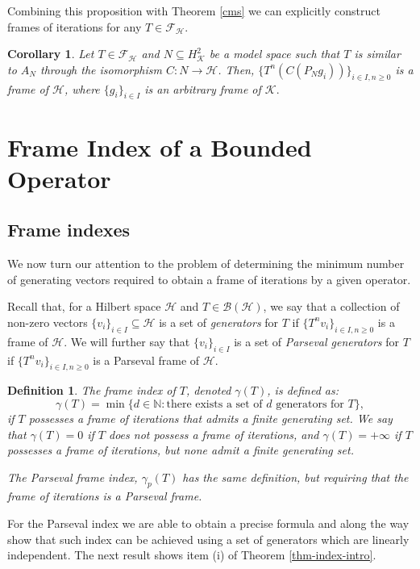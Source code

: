 \documentclass[a4paper,12pt]{amsart}
\def\cB{{\mathcal{B}}}
\def\cF{{\mathcal{F}}}
\def\HH{{\mathcal{H}}}
\def\KK{{\mathcal{K}}}
\def\cF{{\mathcal{F}}}
\def\N{{\mathbb{N}}}
\newtheorem{corollary}[theorem]{Corollary}
\newtheorem{definition}[theorem]{Definition}
\theoremstyle{definition}
\begin{document}
Combining this proposition with Theorem \ref{cms} we can explicitly construct frames of iterations for any $T\in\cF_\HH$.

\begin{corollary}
Let $T\in\cF_\HH$ and $N\subseteq H^2_\KK$ be a model space such that $T$ is similar to $A_N$ through the isomorphism $C:N\rightarrow\HH$. Then, $\{T^n (C(P_N g_i))\}_{i\in I, n\geqslant0}$ is a frame of $\HH$, where $\{g_i\}_{i\in I}$ is an arbitrary frame of 
$\KK.$
\end{corollary} 


\section{Frame Index of a Bounded Operator}\label{index}
\subsection{Frame indexes}
We now turn our attention to the problem of determining the minimum number of generating vectors required to obtain a frame of iterations by a given operator. 

Recall that, for a Hilbert space $\HH$ and $T\in\cB(\HH)$, we say that a collection of non-zero vectors $\{v_i\}_{i\in I}\subseteq\HH$ is a set of {\em generators} for $T$ if $\{T^nv_i\}_{i\in I,n\geqslant0}$ is a frame of $\HH$. We will further say that $\{v_i\}_{i\in I}$ is a set of {\em Parseval generators} for $T$ if $\{T^nv_i\}_{i\in I,n\geqslant0}$ is a Parseval frame of $\HH$.
\begin{definition}
The  frame index of $T$, denoted $\gamma(T)$, is defined as:
\begin{equation*}
\gamma(T)=\min\{ d\in\N :\text{there exists a set of $d$ generators for $T$}\},
\end{equation*}
if $T$ possesses a frame of iterations that admits a finite generating set. We say that $\gamma(T)=0$ if $T$ does not possess a frame of iterations, and $\gamma(T)=+\infty$ if $T$ possesses a frame of iterations, but none admit a finite generating set.

The {\em Parseval frame index}, $\gamma_p(T)$ has the same definition, but requiring that the frame of iterations is a Parseval frame.
\end{definition}

For the Parseval index we are able to obtain a precise formula and along the way show that such index can be achieved using a set of generators which are linearly independent. The next result shows item (i) of Theorem \ref{thm-index-intro}.
\end{document}
